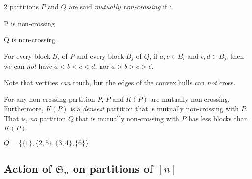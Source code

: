 \begin{definition}
    2 partitions $P$ and $Q$ are said
    \emph{mutually non-crossing} if :\\
    \begin{itemize*}
        \item P is non-crossing\\
        \item Q is non-crossing\\
        \item For every block $B_i$ of $P$ and every
        block $B_j$ of $Q$, if $a,c \in B_i$ and
        $b, d \in B_j$, then we can \emph{not} have
        $a < b < c < d$, nor $a > b > c > d$.
    \end{itemize*}    
\end{definition}

\begin{example}[$P = \{\{1, 2\},\{3, 6\},\ \{4, 5\}\},
    Q = \{\{1, 6\}, \{2\}, \{3, 4\}, \{5\}\}$]
    
\end{example}

\begin{example}[Counter-example : $P = \{\{1, 2\},
    \{3, 6\},\ \{4, 5\}\},
    Q = \{\{1, 6\}, \{2, 5\}, \{3, 4\}\}$]
    
\end{example}

\begin{rem}
    Note that vertices \emph{can} touch, but the edges
    of the convex hulls can \emph{not} cross.
\end{rem}

\begin{prop}
    For any non-crossing partition $P$, $P$ and $K(P)$
    are mutually non-crossing.\\
    Furthermore, $K(P)$ is a \emph{densest} partition that
    is mutually non-crossing with $P$. That is, \emph{no}
    partition $Q$ that is mutually non-crossing with $P$
    has less blocks than $K(P)$.
\end{prop}

\begin{example}[$P = \{1, 2, 6\}, \{3, 5\}, \{4\}\}$]
    $Q = \{\{1\}, \{2, 5\}, \{3, 4\}, \{6\}\}$
    
\end{example}

\subsection{Action of $\mathfrak{S}_n$ on partitions of 
$[n]$}

